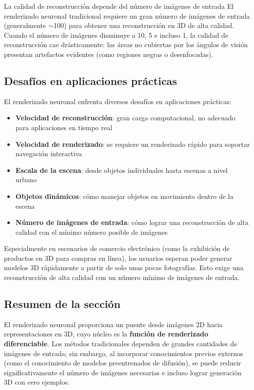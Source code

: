 \begin{warningbox}{La calidad de reconstrucción depende del número de imágenes de entrada}
El renderizado neuronal tradicional requiere un gran número de imágenes de entrada (generalmente $\sim$100) para obtener una reconstrucción en 3D de alta calidad. Cuando el número de imágenes disminuye a 10, 5 e incluso 1, la calidad de reconstrucción cae drásticamente: las áreas no cubiertas por los ángulos de visión presentan artefactos evidentes (como regiones negras o desenfocadas).
\end{warningbox}

\subsection{Desafíos en aplicaciones prácticas}

El renderizado neuronal enfrenta diversos desafíos en aplicaciones prácticas:

\begin{itemize}
    \item \textbf{Velocidad de reconstrucción}: gran carga computacional, no adecuado para aplicaciones en tiempo real
    \item \textbf{Velocidad de renderizado}: se requiere un renderizado rápido para soportar navegación interactiva
    \item \textbf{Escala de la escena}: desde objetos individuales hasta escenas a nivel urbano
    \item \textbf{Objetos dinámicos}: cómo manejar objetos en movimiento dentro de la escena
    \item \textbf{Número de imágenes de entrada}: cómo lograr una reconstrucción de alta calidad con el mínimo número posible de imágenes
\end{itemize}

Especialmente en escenarios de comercio electrónico (como la exhibición de productos en 3D para compras en línea), los usuarios esperan poder generar modelos 3D rápidamente a partir de solo unas pocas fotografías. Esto exige una reconstrucción de alta calidad con un número mínimo de imágenes de entrada.

\subsection{Resumen de la sección}

El renderizado neuronal proporciona un puente desde imágenes 2D hacia representaciones en 3D, cuyo núcleo es la \textbf{función de renderizado diferenciable}. Los métodos tradicionales dependen de grandes cantidades de imágenes de entrada; sin embargo, al incorporar conocimientos previos externos (como el conocimiento de modelos preentrenados de difusión), se puede reducir significativamente el número de imágenes necesarias e incluso lograr generación 3D con cero ejemplos.

\newpage

